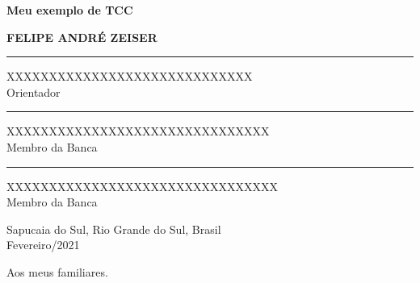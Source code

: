 \documentclass[portuguese,12pt,oneside,a4paper]{book}
\begin{document}
\newpage





\newpage
\thispagestyle{empty}
    \begin{center}
        

	    \textbf{\LARGE{Meu exemplo de TCC}}\\

        \vspace*{3cm}

    	\textbf{FELIPE ANDRÉ ZEISER}
    
    	\vskip 3cm


		\rule{10cm}{0.1mm}
		XXXXXXXXXXXXXXXXXXXXXXXXXXXXX\\
		Orientador
		
    	\vskip 2cm
    			
		\rule{10cm}{0.1mm}
		XXXXXXXXXXXXXXXXXXXXXXXXXXXXXXX\\
		Membro da Banca
			
    	\vskip 2cm
		
		\rule{10cm}{0.1mm}
		XXXXXXXXXXXXXXXXXXXXXXXXXXXXXXXX\\
		Membro da Banca
			
		\vskip 3cm
			
		Sapucaia do Sul, Rio Grande do Sul, Brasil\\
		Fevereiro/2021

    \end{center}
\pagebreak

\newpage
\thispagestyle{empty}

        
        \vspace*{20.0cm}

        \begin{flushright}
			Aos meus familiares.
        \end{flushright}



\pagebreak

\newpage
\thispagestyle{empty}
\end{document}
